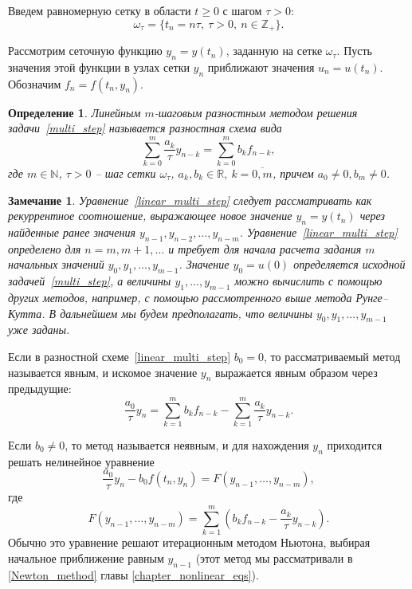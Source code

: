 \documentclass[11pt,a4paper,twoside,listtotoc,bibtotoc]{report}
\numberwithin{equation}{section}
\newtheorem*{definition}{Определение}
\theoremstyle{definition}
\theoremstyle{plain}
\newtheorem*{note*}{Замечание}
\begin{document}
Введем равномерную сетку в области $t\geqslant 0$ с шагом $\tau > 0$:
%
$$
    \omega_\tau=\{t_n=n\tau,~\tau > 0,~n\in\mathbb{Z}_+\}.
$$

Рассмотрим сеточную функцию $y_n = y(t_n)$, заданную
на сетке $\omega_\tau$. Пусть значения этой функции в узлах сетки $y_n$ приближают
значения $u_n=u(t_n)$. Обозначим $f_n=f(t_n,y_n)$.

\begin{definition}
%
    Линейным $m$-шаговым разностным методом решения задачи~\eqref{multi_step}
    называется разностная схема вида
    \begin{equation}
        \label{linear_multi_step}
        \sum_{k=0}^m \frac{a_k}{\tau} y_{n-k} = \sum_{k=0}^m b_k f_{n-k},
    \end{equation}
    где $m\in\mathbb{N}$, $\tau > 0$ -- шаг сетки $\omega_\tau$, $a_k, b_k \in\mathbb{R},~k=\overline{0,m}$,
    причем $a_0 \not= 0, b_m \not= 0$.
%
\end{definition}
%


%
\begin{note*}
%
    Уравнение~\eqref{linear_multi_step} следует рассматривать как рекуррентное
    соотношение, выражающее новое значение $y_n=y(t_n)$ через найденные ранее
    значения $y_{n-1}, y_{n-2},\ldots, y_{n-m}$. Уравнение~\eqref{linear_multi_step}
    определено для $n = m, m+1, \ldots$\; и требует для начала расчета задания $m$
    начальных значений $y_0, y_1, \ldots, y_{m-1}$. Значение $y_0=u(0)$ определяется
    исходной задачей~\eqref{multi_step}, а величины $y_1,\ldots,y_{m-1}$ можно вычислить
    с помощью других методов, например, с помощью рассмотренного выше метода Рунге--Кутта.
    В дальнейшем мы будем предполагать,
    что величины $y_0, y_1, \ldots, y_{m-1}$ уже заданы.
%
\end{note*}
%
Если в разностной схеме~\eqref{linear_multi_step} $b_0=0$,
то рассматриваемый метод называется явным, и искомое значение $y_n$
выражается явным образом через предыдущие:
%
$$
    \frac{a_0}{\tau} y_{n} = \sum_{k=1}^m b_kf_{n-k}-\sum_{k=1}^m \frac{a_k}
    {\tau}y_{n-k}.
$$
%

Если $b_0 \neq 0$, то метод называется неявным,
и для нахождения $y_n$ приходится решать нелинейное уравнение
%
$$
    \frac{a_0}{\tau} y_{n} - b_0f(t_n,y_n)=F(y_{n-1},\ldots,y_{n-m}),
$$
%
где
%
$$
    F(y_{n-1},\ldots,y_{n-m})=\sum_{k=1}^m(b_kf_{n-k}-\frac{a_k}{\tau}
    y_{n-k}).
$$
%
Обычно это уравнение решают итерационным методом Ньютона, выбирая начальное
приближение равным $y_{n-1}$  (этот метод мы рассматривали
в \ref{Newton_method} главы \ref{chapter_nonlinear_eqs}).
\end{document}
